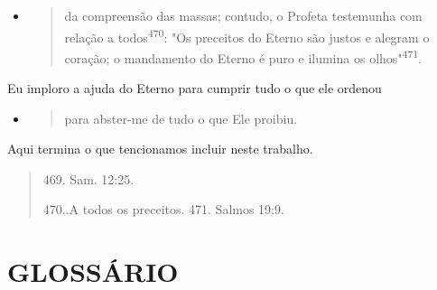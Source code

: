 \begin{itemize}
\item
 \begin{quote}
 da compreensão das massas; contudo, o Profeta testemunha com relação a
 todos\textsuperscript{470}: "Os preceitos do Eterno são justos e
 alegram o coração; o manda­mento do Eterno é puro e ilumina os
 olhos"\textsuperscript{471}.
 \end{quote}
\end{itemize}

Eu imploro a ajuda do Eterno para cumprir tudo o que ele ordenou

\begin{itemize}
\item
 \begin{quote}
 para abster-me de tudo o que Ele proibiu.
 \end{quote}
\end{itemize}

Aqui termina o que tencionamos incluir neste trabalho.

\begin{quote}
469. Sam. 12:25.

470..A todos os preceitos. 471. Salmos 19:9.
\end{quote}

\chapter{GLOSSÁRIO}


